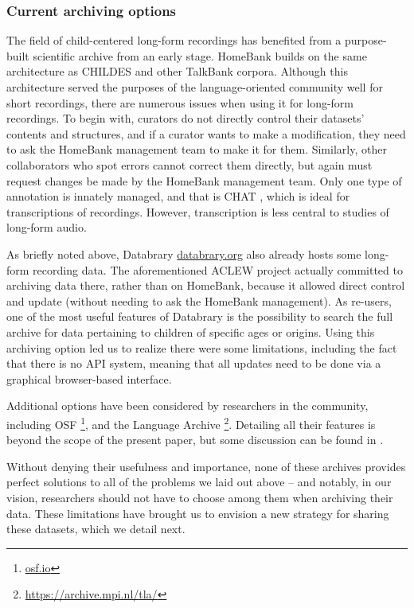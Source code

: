 \documentclass[smallextended]{svjour3}       %
\begin{document}
\subsubsection*{Current archiving options}

The field of child-centered long-form recordings has benefited from a purpose-built scientific archive from an early stage. HomeBank \cite{vandam2016homebank} builds on the same architecture as CHILDES \cite{MacWhinney2000} and other TalkBank corpora. Although this architecture served the purposes of the language-oriented community well for short recordings, there are numerous issues when using it for long-form recordings. To begin with, curators do not directly control their datasets' contents and structures, and if a curator wants to make a modification, they need to ask the HomeBank management team to make it for them. Similarly, other collaborators who spot errors cannot correct them directly, but again must request changes be made by the HomeBank management team.  Only one type of annotation is innately managed, and that is CHAT \cite{MacWhinney2000}, which is ideal for transcriptions of  recordings. However, transcription is less central to studies of long-form audio.

As briefly noted above, Databrary \url{databrary.org} also already hosts some long-form recording data. The aforementioned ACLEW project actually committed to archiving data there, rather than on HomeBank, because it allowed direct control and update (without needing to ask the HomeBank management).  As re-users, one of the most useful features of Databrary is the possibility to search the full archive for data pertaining to children of specific ages or origins. Using this archiving option led us to realize there were some limitations, including the fact that there is no API system, meaning that all updates need to be done via a graphical browser-based interface.

Additional options have been considered by researchers in the community, including OSF \footnote{\url{osf.io}}, and the Language Archive \footnote{\url{https://archive.mpi.nl/tla/}}. Detailing all their features is beyond the scope of the present paper, but some discussion can be found in \cite{casillas2019step}. 

Without denying their usefulness and importance, none of these archives provides perfect solutions to all of the problems we laid out above -- and notably, in our vision, researchers should not have to choose among them when archiving their data. These limitations have brought us to envision a new strategy for sharing these datasets, which we detail next. 
\end{document}
